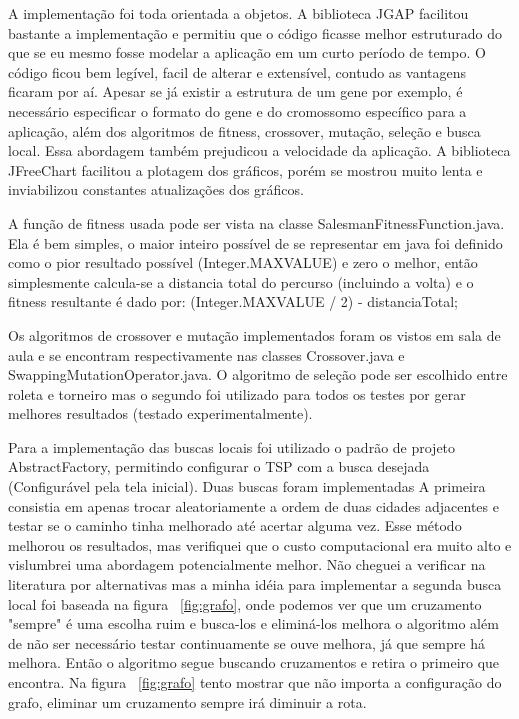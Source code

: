 \documentclass{acm_proc_article-sp}
\begin{document}
A implementação foi toda orientada a objetos. A biblioteca JGAP facilitou bastante a implementação e permitiu que o código ficasse melhor estruturado do que se eu mesmo fosse modelar a aplicação em um curto período de tempo. O código ficou bem legível, facil de alterar e extensível, contudo as vantagens ficaram por aí. Apesar se já existir a estrutura de um gene por exemplo, é necessário especificar o formato do gene e do cromossomo específico para a aplicação, além dos algoritmos de fitness, crossover, mutação, seleção e busca local. Essa abordagem também prejudicou a velocidade da aplicação. A biblioteca JFreeChart facilitou a plotagem dos gráficos, porém se mostrou muito lenta e inviabilizou constantes atualizações dos gráficos.

A função de fitness usada pode ser vista na classe SalesmanFitnessFunction.java. Ela é bem simples, o maior inteiro possível de se representar em java foi definido como o pior resultado possível (Integer.MAXVALUE) e zero o melhor, então simplesmente calcula-se a distancia total do percurso (incluindo a volta) e o fitness resultante é dado por: (Integer.MAXVALUE / 2) - distanciaTotal;

Os algoritmos de crossover e mutação implementados foram os vistos em sala de aula e se encontram respectivamente nas classes Crossover.java e SwappingMutationOperator.java. O algoritmo de seleção pode ser escolhido entre roleta e torneiro mas o segundo foi utilizado para todos os testes por gerar melhores resultados (testado experimentalmente).

Para a implementação das buscas locais foi utilizado o padrão de projeto AbstractFactory, permitindo configurar o TSP com a busca desejada (Configurável pela tela inicial). Duas buscas foram implementadas A primeira consistia em apenas trocar aleatoriamente a ordem de duas cidades adjacentes e testar se o caminho tinha melhorado até acertar alguma vez. Esse método melhorou os resultados, mas verifiquei que o custo computacional era muito alto e vislumbrei uma abordagem potencialmente melhor. Não cheguei a verificar na literatura por alternativas mas a minha idéia para implementar a segunda busca local foi baseada na figura ~\ref{fig:grafo}, onde podemos ver que um cruzamento "sempre" é uma escolha ruim e busca-los e eliminá-los melhora o algoritmo além de não ser necessário testar continuamente se ouve melhora, já que sempre há melhora. Então o algoritmo segue buscando cruzamentos e retira o primeiro que encontra. Na figura ~\ref{fig:grafo} tento mostrar que não importa a configuração do grafo, eliminar um cruzamento sempre irá diminuir a rota.
\end{document}
